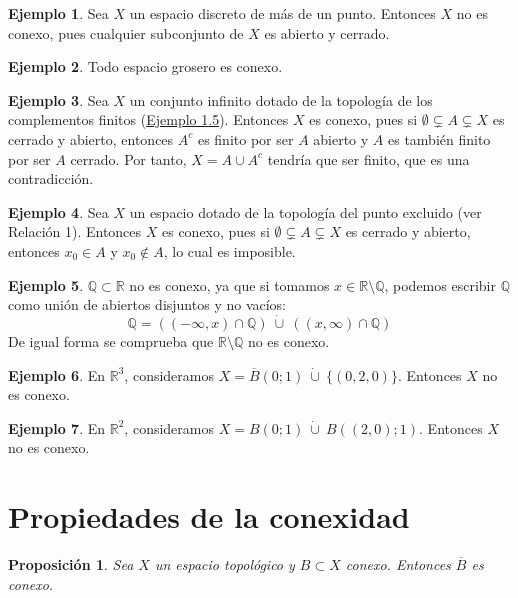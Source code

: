 \documentclass[12pt]{report}
\newtheorem{proposition}{Proposición}[chapter]
\theoremstyle{definition}
\theoremstyle{definition}
\newtheorem{example}{Ejemplo}[chapter]
\theoremstyle{remark}
\newcommand{\R}{\mathbb R}
\newcommand{\Q}{\mathbb Q}
\begin{document}
\begin{example}
Sea $X$ un espacio discreto de más de un punto. Entonces $X$ no es conexo, pues cualquier subconjunto de $X$ es abierto y cerrado.
\end{example}

\begin{example}
Todo espacio grosero es conexo.
\end{example}

\begin{example}
Sea $X$ un conjunto infinito dotado de la topología de los complementos finitos (\hyperref[ex1.5.]{\color{blue}Ejemplo 1.5}). Entonces $X$ es conexo, pues si $\emptyset \subsetneq A \subsetneq X$ es cerrado y abierto, entonces $A^c$ es finito por ser $A$ abierto y $A$ es también finito por ser $A$ cerrado. Por tanto, $X = A \cup A^c$ tendría que ser finito, que es una contradicción.
\end{example}

\begin{example}
Sea $X$ un espacio dotado de la topología del punto excluido (ver Relación 1). Entonces $X$ es conexo, pues si $\emptyset \subsetneq A \subsetneq X$ es cerrado y abierto, entonces $x_0 \in A$ y $x_0 \notin A$, lo cual es imposible.
\end{example}

\begin{example}
$\Q \subset \R$ no es conexo, ya que si tomamos $x \in \R \setminus \Q$, podemos escribir $\Q$ como unión de abiertos disjuntos y no vacíos: \[\Q = ((-\infty,x) \cap \Q) \ \dot\cup \ ((x,\infty) \cap \Q)\] De igual forma se comprueba que $\R \setminus \Q$ no es conexo.
\end{example}

\begin{example}
En $\R^3$, consideramos $X = \overline{B}(0;1) \ \dot\cup \ \{(0,2,0)\}$. Entonces $X$ no es conexo.
\end{example}

\begin{example}
En $\R^2$, consideramos $X = B(0;1) \ \dot\cup \ B((2,0);1)$. Entonces $X$ no es conexo.
\end{example}

\section{Propiedades de la conexidad}

\begin{proposition}
\label{prop2.1.}
Sea $X$ un espacio topológico y $B \subset X$ conexo. Entonces $\overline{B}$ es conexo.
\end{proposition}
\end{document}
